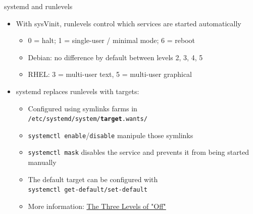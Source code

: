 \documentclass[11pt,final,usepdftitle=false]{beamer}
\begin{document}
\begin{frame}{systemd and runlevels}
	\begin{itemize}
		\item With sysVinit, runlevels control which services are started automatically
			\begin{itemize}
				\item 0 = halt; 1 = single-user / minimal mode; 6 = reboot
				\item Debian: no difference by default between levels 2, 3, 4, 5
				\item RHEL: 3 = multi-user text, 5 = multi-user graphical
			\end{itemize}
			\hbr
		\item systemd replaces runlevels with \alert{targets}:
			\begin{itemize}
				\item Configured using symlinks farms in \texttt{/etc/systemd/system/\textbf{target}.wants/}
					\hbr
				\item \texttt{systemctl enable}/\texttt{disable} manipule those symlinks
					\hbr
				\item \texttt{systemctl mask} disables the service and prevents it from being started manually
					\hbr
				\item The default target can be configured with\\ \texttt{systemctl get-default/set-default}
					\hbr
				\item More information: \href{http://0pointer.net/blog/projects/three-levels-of-off.html}{\ul{The Three Levels of "Off"}}
			\end{itemize}
	\end{itemize}
\end{frame}
\end{document}
